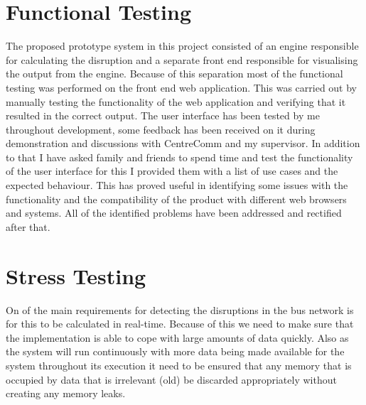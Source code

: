 \section{Functional Testing}
The proposed prototype system in this project consisted of an engine responsible for calculating the disruption and a separate front end responsible for visualising the output from the engine. Because of this separation most of the functional testing was performed on the front end web application. This was carried out by manually testing the functionality of the web application and verifying that it resulted in the correct output. The user interface has been tested by me throughout development, some feedback has been received on it during demonstration and discussions with CentreComm and my supervisor. In addition to that I have asked family and friends to spend time and test the functionality of the user interface for this I provided them with a list of use cases and the expected behaviour. This has proved useful in identifying some issues with the functionality and the compatibility of the product with different web browsers and systems. All of the identified problems have been addressed and rectified after that.

\section{Stress Testing}
On of the main requirements for detecting the disruptions in the bus network is for this to be calculated in real-time. Because of this we need to make sure that the implementation is able to cope with large amounts of data quickly. Also as the system will run continuously with more data being made available for the system throughout its execution it need to be ensured that any memory that is occupied by data that is irrelevant (old) be discarded appropriately without creating any memory leaks. 

